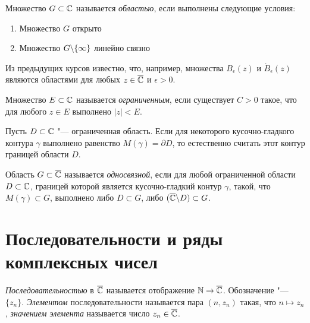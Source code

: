 \begin{definition}
	Множество $G \subset \mathbb{C}$ называется \textit{областью}, если выполнены следующие условия:
	\begin{enumerate}
		\item Множество $G$ открыто
		\item Множество $G \backslash \{\infty\}$ линейно связно
	\end{enumerate}
\end{definition}

\begin{note}
	Из предыдущих курсов известно, что, например, множества $B_\epsilon(z)$ и $\mathring B_\epsilon(z)$ являются областями для любых $z \in \overline{\mathbb{C}}$ и $\epsilon > 0$.
\end{note}

\begin{definition}
	Множество $E \subset \mathbb{C}$ называется \textit{ограниченным}, если существует $C > 0$ такое, что для любого $z \in E$ выполнено $|z| < E$.
\end{definition}

\begin{note}
	Пусть $D \subset \mathbb{C}$ "--- ограниченная область. Если для некоторого кусочно-гладкого контура $\gamma$ выполнено равенство $M(\gamma) = \partial D$, то естественно считать этот контур границей области $D$.
\end{note}

\begin{definition}
	Область $G \subset \overline{\mathbb{C}}$ называется \textit{односвязной}, если для любой ограниченной области $D \subset \mathbb{C}$, границей которой является кусочно-гладкий контур $\gamma$, такой, что $M(\gamma) \subset G$, выполнено либо $D \subset G$, либо $(\overline{\mathbb{C}} \backslash D) \subset G$.
\end{definition}

\section{Последовательности и ряды комплексных чисел}

\begin{definition}
	\textit{Последовательностью} в $\overline{\mathbb{C}}$ называется отображение $\mathbb{N} \to \overline{\mathbb{C}}$. Обозначение "--- $\{z_n\}$. \textit{Элементом} последовательности называется пара $(n, z_n)$ такая, что $n \mapsto z_n$, \textit{значением элемента} называется число $z_n \in \overline{\mathbb{C}}$.
\end{definition}

